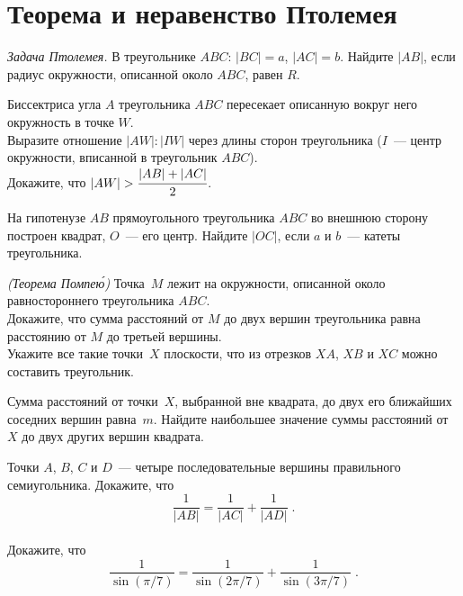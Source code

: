 
\section*{Теорема и неравенство Птолемея}


\begin{problems}

\item\emph{Задача Птолемея.}
В треугольнике $ABC$: $|BC| = a$, $|AC| = b$.
Найдите $|AB|$, если радиус окружности, описанной около $ABC$, равен $R$.

\item
Биссектриса угла $A$ треугольника $ABC$ пересекает описанную вокруг него
окружность в точке $W$.
\\
\subproblem
Выразите отношение $|AW| : |IW|$ через длины сторон треугольника
($I$~--- центр окружности, вписанной в треугольник $ABC$).
\\[0.5ex]
\subproblem
Докажите, что $|AW| > \cfrac{|AB| + |AC|}{2}$.

\item
На гипотенузе $AB$ прямоугольного треугольника $ABC$ во внешнюю сторону
построен квадрат, $O$~--- его центр.
Найдите $|OC|$, если $a$ и $b$~--- катеты треугольника.


\item\emph{(Теорема Помпе\'{ю})}
Точка~$M$ лежит на окружности, описанной около равностороннего
треугольника $ABC$.
\\
\subproblem
Докажите, что сумма расстояний от $M$ до двух вершин треугольника равна
расстоянию от $M$ до третьей вершины.
\\
\subproblem
Укажите все такие точки~$X$ плоскости, что из отрезков $XA$, $XB$ и $XC$ можно
составить треугольник.

\item
Сумма расстояний от точки~$X$, выбранной вне квадрата, до двух его ближайших
соседних вершин равна~$m$.
Найдите наибольшее значение суммы расстояний от $X$ до двух других вершин
квадрата.

\item
\subproblem
Точки $A$, $B$, $C$ и $D$~--- четыре последовательные вершины правильного
семиугольника.
Докажите, что
\[
    \frac{1}{|AB|} = \frac{1}{|AC|} + \frac{1}{|AD|}
\;.\]
\\
\subproblem
Докажите, что
\[
    \frac{1}{\sin (\pi / 7)}
=
    \frac{1}{\sin (2 \pi / 7)}
    +
    \frac{1}{\sin (3 \pi / 7)}
\;.\]


\end{problems}
